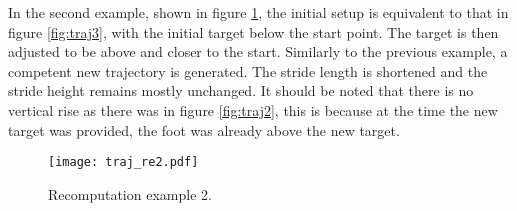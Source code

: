                 \noindent
                In the second example, shown in figure \ref{fig:traj_re2}, the initial setup is equivalent to that in figure \ref{fig:traj3}, with the initial target below the start point. The target is then adjusted to be above and closer to the start. Similarly to the previous example, a competent new trajectory is generated. The stride length is shortened and the stride height remains mostly unchanged. It should be noted that there is no vertical rise as there was in figure \ref{fig:traj2}, this is because at the time the new target was provided, the foot was already above the new target.
                \begin{figure}[h]
                    \centering
                    \texttt{[image: traj\_re2.pdf]}
                    \caption{Recomputation example 2.}
                    \label{fig:traj_re2}
                \end{figure}
                
                